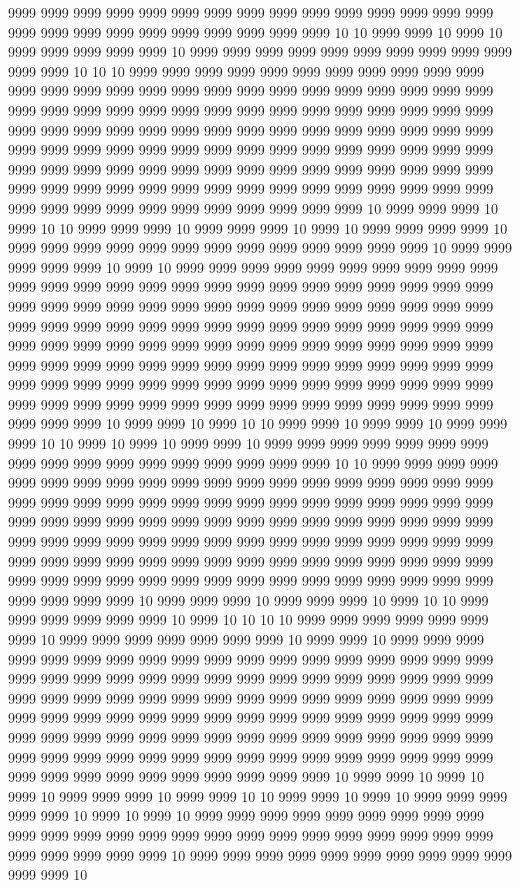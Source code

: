 9999 9999 9999 9999 9999 9999 9999 9999 9999 9999 9999 9999 9999 9999 9999 9999 9999 9999 9999 9999 9999 9999 9999 9999 9999 10 10 9999 9999 10 9999 10 9999 9999 9999 9999 9999 10 9999 9999 9999 9999 9999 9999 9999 9999 9999 9999 9999 9999 10 10 10 9999 9999 9999 9999 9999 9999 9999 9999 9999 9999 9999 9999 9999 9999 9999 9999 9999 9999 9999 9999 9999 9999 9999 9999 9999 9999 9999 9999 9999 9999 9999 9999 9999 9999 9999 9999 9999 9999 9999 9999 9999 9999 9999 9999 9999 9999 9999 9999 9999 9999 9999 9999 9999 9999 9999 9999 9999 9999 9999 9999 9999 9999 9999 9999 9999 9999 9999 9999 9999 9999 9999 9999 9999 9999 9999 9999 9999 9999 9999 9999 9999 9999 9999 9999 9999 9999 9999 9999 9999 9999 9999 9999 9999 9999 9999 9999 9999 9999 9999 9999 9999 9999 9999 9999 9999 9999 9999 9999 9999 9999 9999 9999 10 9999 9999 9999 10 9999 10 10 9999 9999 9999 10 9999 9999 9999 10 9999 10 9999 9999 9999 9999 10 9999 9999 9999 9999 9999 9999 9999 9999 9999 9999 9999 9999 9999 10 9999 9999 9999 9999 9999 10 9999 10 9999 9999 9999 9999 9999 9999 9999 9999 9999 9999 9999 9999 9999 9999 9999 9999 9999 9999 9999 9999 9999 9999 9999 9999 9999 9999 9999 9999 9999 9999 9999 9999 9999 9999 9999 9999 9999 9999 9999 9999 9999 9999 9999 9999 9999 9999 9999 9999 9999 9999 9999 9999 9999 9999 9999 9999 9999 9999 9999 9999 9999 9999 9999 9999 9999 9999 9999 9999 9999 9999 9999 9999 9999 9999 9999 9999 9999 9999 9999 9999 9999 9999 9999 9999 9999 9999 9999 9999 9999 9999 9999 9999 9999 9999 9999 9999 9999 9999 9999 9999 9999 9999 9999 9999 9999 9999 9999 9999 9999 9999 9999 9999 9999 9999 9999 9999 9999 9999 10 9999 9999 10 9999 10 10 9999 9999 10 9999 9999 10 9999 9999 9999 10 10 9999 10 9999 10 9999 9999 10 9999 9999 9999 9999 9999 9999 9999 9999 9999 9999 9999 9999 9999 9999 9999 9999 9999 10 10 9999 9999 9999 9999 9999 9999 9999 9999 9999 9999 9999 9999 9999 9999 9999 9999 9999 9999 9999 9999 9999 9999 9999 9999 9999 9999 9999 9999 9999 9999 9999 9999 9999 9999 9999 9999 9999 9999 9999 9999 9999 9999 9999 9999 9999 9999 9999 9999 9999 9999 9999 9999 9999 9999 9999 9999 9999 9999 9999 9999 9999 9999 9999 9999 9999 9999 9999 9999 9999 9999 9999 9999 9999 9999 9999 9999 9999 9999 9999 9999 9999 9999 9999 9999 9999 9999 9999 9999 9999 9999 9999 9999 9999 9999 9999 9999 9999 9999 10 9999 9999 9999 10 9999 9999 9999 10 9999 10 10 9999 9999 9999 9999 9999 9999 10 9999 10 10 10 10 9999 9999 9999 9999 9999 9999 9999 10 9999 9999 9999 9999 9999 9999 9999 10 9999 9999 10 9999 9999 9999 9999 9999 9999 9999 9999 9999 9999 9999 9999 9999 9999 9999 9999 9999 9999 9999 9999 9999 9999 9999 9999 9999 9999 9999 9999 9999 9999 9999 9999 9999 9999 9999 9999 9999 9999 9999 9999 9999 9999 9999 9999 9999 9999 9999 9999 9999 9999 9999 9999 9999 9999 9999 9999 9999 9999 9999 9999 9999 9999 9999 9999 9999 9999 9999 9999 9999 9999 9999 9999 9999 9999 9999 9999 9999 9999 9999 9999 9999 9999 9999 9999 9999 9999 9999 9999 9999 9999 9999 9999 9999 9999 9999 9999 9999 9999 9999 9999 9999 9999 9999 10 9999 9999 10 9999 10 9999 10 9999 9999 9999 10 9999 9999 10 10 9999 9999 10 9999 10 9999 9999 9999 9999 9999 10 9999 10 9999 10 9999 9999 9999 9999 9999 9999 9999 9999 9999 9999 9999 9999 9999 9999 9999 9999 9999 9999 9999 9999 9999 9999 9999 9999 9999 9999 9999 9999 9999 10 9999 9999 9999 9999 9999 9999 9999 9999 9999 9999 9999 9999 10 